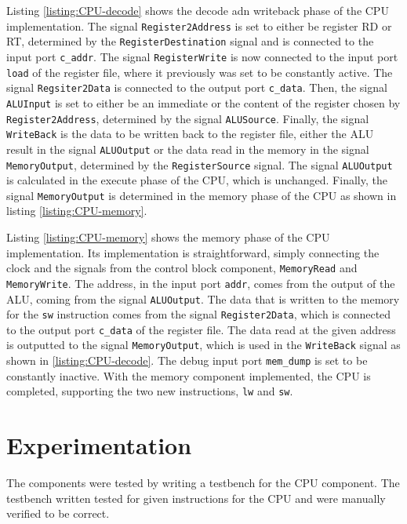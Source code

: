 \documentclass[11pt]{report}
\begin{document}
Listing \ref{listing:CPU-decode} shows the decode adn writeback phase of the CPU implementation. The
signal \verb|Register2Address| is set to either be register RD or RT, determined by the
\verb|RegisterDestination| signal and is connected to the input port \verb|c_addr|. The signal
\verb|RegisterWrite| is now connected to the input port \verb|load| of the register file, where it
previously was set to be constantly active. The signal \verb|Regsiter2Data| is connected to the
output port \verb|c_data|. Then, the signal \verb|ALUInput| is set to either be an immediate or the
content of the register chosen by \verb|Register2Address|, determined by the signal
\verb|ALUSource|. Finally, the signal \verb|WriteBack| is the data to be written back to the
register file, either the ALU result in the signal \verb|ALUOutput| or the data read in the memory
in the signal \verb|MemoryOutput|, determined by the \verb|RegisterSource| signal. The signal
\verb|ALUOutput| is calculated in the execute phase of the CPU, which is unchanged. Finally, the
signal \verb|MemoryOutput| is determined in the memory phase of the CPU as shown in listing
\ref{listing:CPU-memory}.


Listing \ref{listing:CPU-memory} shows the memory phase of the CPU implementation. Its
implementation is straightforward, simply connecting the clock and the signals from the control block
component, \verb|MemoryRead| and \verb|MemoryWrite|. The address, in the input port \verb|addr|,
comes from the output of the ALU, coming from the signal \verb|ALUOutput|. The data that is written
to the memory for the \verb|sw| instruction comes from the signal \verb|Register2Data|, which is
connected to the output port \verb|c_data| of the register file. The data read at the given address
is outputted to the signal \verb|MemoryOutput|, which is used in the \verb|WriteBack| signal as
shown in \ref{listing:CPU-decode}. The debug input port \verb|mem_dump| is set to be constantly
inactive. With the memory component implemented, the CPU is completed, supporting the two new
instructions, \verb|lw| and \verb|sw|.

\section*{Experimentation}
The components were tested by writing a testbench for the CPU component. The testbench written
tested for given instructions for the CPU and were manually verified to be correct.
\end{document}
